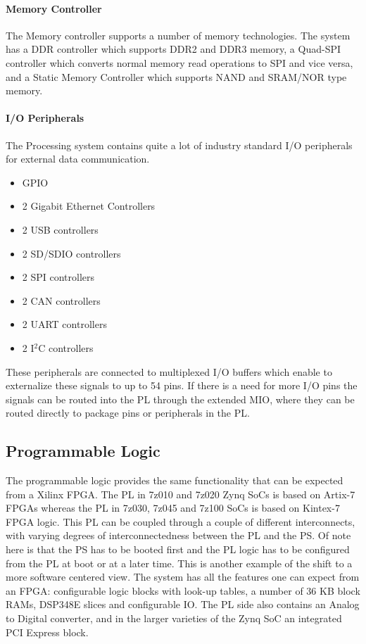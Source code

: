 		\paragraph{Memory Controller}
		The Memory controller supports a number of memory technologies. The system has a DDR controller which supports DDR2 and DDR3 memory, a Quad-SPI controller which converts normal memory read operations to SPI and vice versa, and a Static Memory Controller which supports NAND and SRAM/NOR type memory.

		\paragraph{I/O Peripherals}
		The Processing system contains quite a lot of industry standard I/O peripherals for external data communication.
			\begin{multicols}{2}
				\begin{itemize}
					\item GPIO
					\item 2 Gigabit Ethernet Controllers
					\item 2 USB controllers
					\item 2 SD/SDIO controllers
					\item 2 SPI controllers
					\item 2 CAN controllers
					\item 2 UART controllers
					\item 2 I$^{2}$C controllers
				\end{itemize}
			\end{multicols}

		These peripherals are connected to multiplexed I/O buffers which enable to externalize these signals to up to 54 pins. If there is a need for more I/O pins the signals can be routed into the PL through the extended MIO, where they can be routed directly to package pins or peripherals in the PL.

	\subsection{Programmable Logic}
	The programmable logic provides the same functionality that can be expected from a Xilinx FPGA. The PL in 7z010 and 7z020 Zynq SoCs is based on Artix-7 FPGAs whereas the PL in 7z030, 7z045 and 7z100 SoCs is based on Kintex-7 FPGA logic. This PL can be coupled through a couple of different interconnects, with varying degrees of interconnectedness between the PL and the PS. Of note here is that the PS has to be booted first and the PL logic has to be configured from the PL at boot or at a later time. This is another example of the shift to a more software centered view. The system has all the features one can expect from an FPGA: configurable logic blocks with look-up tables, a number of 36 KB block RAMs, DSP348E slices and configurable IO. The PL side also contains an Analog to Digital converter, and in the larger varieties of the Zynq SoC an integrated PCI Express block.

